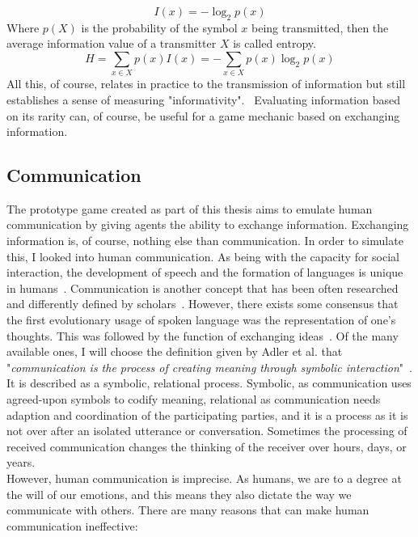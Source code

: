 \begin{equation}
	I(x) = -\log_2 p(x)
\end{equation}
Where $p(X)$ is the probability of the symbol $x$ being transmitted, then the average information value of a transmitter $X$ is called entropy.
\begin{equation}
	H = \sum_{x \in X} p(x)I(x) = -\sum_{x \in X} p(x)\log_2 p(x)
\end{equation}
All this, of course, relates in practice to the transmission of information but still establishes a sense of measuring "informativity".~\cite{Shannon1949} Evaluating information based on its rarity can, of course, be useful for a game mechanic based on exchanging information.
\subsection{Communication}
The prototype game created as part of this thesis aims to emulate human communication by giving agents the ability to exchange information. Exchanging information is, of course, nothing else than communication. In order to simulate this, I looked into human communication. As being with the capacity for social interaction, the development of speech and the formation of languages is unique in humans~\cite{Levinson2006}. Communication is another concept that has been often researched and differently defined by scholars~\cite{Littlejohn2010}. However, there exists some consensus that the first evolutionary usage of spoken language was the representation of one's thoughts. This was followed by the function of exchanging ideas~\cite{Ruben1985}. Of the many available ones, I will choose the definition given by Adler et al. that "\textit{communication is the process of creating meaning through symbolic interaction}"~\cite{Adler2016}. It is described as a symbolic, relational process. Symbolic, as communication uses agreed-upon symbols to codify meaning, relational as communication needs adaption and coordination of the participating parties, and it is a process as it is not over after an isolated utterance or conversation. Sometimes the processing of received communication changes the thinking of the receiver over hours, days, or years.~\cite{Adler2016}\\
However, human communication is imprecise. As humans, we are to a degree at the will of our emotions, and this means they also dictate the way we communicate with others. There are many reasons that can make human communication ineffective:
